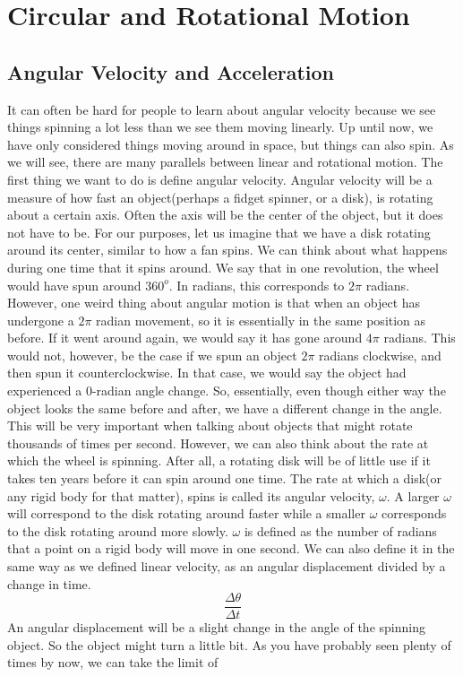 \documentclass{article}[gray]
\numberwithin{equation}{subsection}
\begin{document}
\pagebreak
\section{Circular and Rotational Motion}

\subsection{Angular Velocity and Acceleration}
\newline

It can often be hard for people to learn about angular velocity because we see things spinning a lot less than we see them moving linearly. Up until now, we have only considered things moving around in space, but things can also spin. As we will see, there are many parallels between linear and rotational motion. The first thing we want to do is define angular velocity. Angular velocity will be a measure of how fast an object(perhaps a fidget spinner, or a disk), is rotating about a certain axis. Often the axis will be the center of the object, but it does not have to be. For our purposes, let us imagine that we have a disk rotating around its center, similar to how a fan spins. We can think about what happens during one time that it spins around. We say that in one revolution, the wheel would have spun around $360^o$. In radians, this corresponds to $2\pi$ radians. However, one weird thing about angular motion is that when an object has undergone a $2\pi$ radian movement, so it is essentially in the same position as before. If it went around again, we would say it has gone around $4\pi$ radians. This would not, however, be the case if we spun an object $2\pi$ radians clockwise, and then spun it counterclockwise. In that case, we would say the object had experienced a 0-radian angle change. So, essentially, even though either way the object looks the same before and after, we have a different change in the angle. This will be very important when talking about objects that might rotate thousands of times per second. However, we can also think about the rate at which the wheel is spinning. After all, a rotating disk will be of little use if it takes ten years before it can spin around one time. The rate at which a disk(or any rigid body for that matter), spins is called its angular velocity, $\omega$. A larger $\omega$ will correspond to the disk rotating around faster while a smaller $\omega$ corresponds to the disk rotating around more slowly. $\omega$ is defined as the number of radians that a point on a rigid body will move in one second. We can also define it in the same way as we defined linear velocity, as an angular displacement divided by a change in time. $$\frac{\Delta \theta}{\Delta t}$$ An angular displacement will be a slight change in the angle of the spinning object. So the object might turn a little bit. As you have probably seen plenty of times by now, we can take the limit of 
\end{document}
